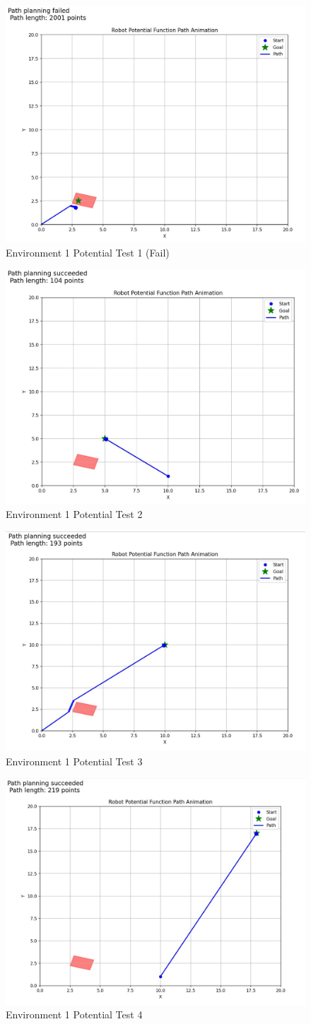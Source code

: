 \documentclass{article}
\begin{document}
\begin{figure} [H]
    \centering
    \includegraphics[width=0.5\linewidth]{latex_media/Env1PotentialTest1.jpg}
    \caption{Environment 1 Potential Test 1 (Fail)}
\end{figure}

\begin{figure} [H]
    \centering
    \includegraphics[width=0.5\linewidth]{latex_media/Env1PotentialTest2.jpg}
    \caption{Environment 1 Potential Test 2}
\end{figure}

\begin{figure} [H]
    \centering
    \includegraphics[width=0.5\linewidth]{latex_media/Env1PotentialTest3.jpg}
    \caption{Environment 1 Potential Test 3}
\end{figure}

\begin{figure} [H]
    \centering
    \includegraphics[width=0.5\linewidth]{latex_media/Env1PotentialTest4.jpg}
    \caption{Environment 1 Potential Test 4}
\end{figure}
\end{document}
